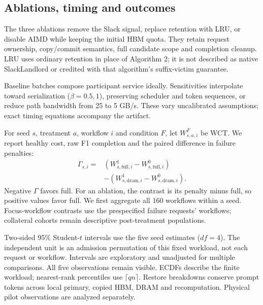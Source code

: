 \subsection{Ablations, timing and outcomes}
The three ablations remove the Slack signal, replace retention with LRU, or
disable AIMD while keeping the initial HBM quota. They retain request ownership,
copy/commit semantics, full candidate scope and completion cleanup. LRU uses
ordinary retention in place of Algorithm 2; it is not described as native
SlackLandlord or credited with that algorithm's suffix-victim guarantee.

Baseline batches compose participant service ideally. Sensitivities
interpolate toward serialization ($\beta=0.5,1$), preserving scheduler and
token sequences, or reduce path bandwidth from 25 to 5 GB/s. These vary
uncalibrated assumptions; exact timing equations accompany the artifact.

For seed $s$, treatment $a$, workflow $i$ and condition $F$, let
$W_{s,a,i}^{F}$ be WCT. We report healthy cost, raw F1 completion and the
paired difference in failure penalties:
\begin{equation}
\begin{split}
\Gamma_{s,i}={}&(W_{s,\mathrm{full},i}^{1}-W_{s,\mathrm{full},i}^{0})\\
 &-(W_{s,\mathrm{dram},i}^{1}-W_{s,\mathrm{dram},i}^{0}).
\end{split}
\end{equation}
Negative $\Gamma$ favors full. For an ablation, the contrast is its penalty
minus full, so positive values favor full. We first aggregate all 160
workflows within a seed. Focus-workflow contrasts use the prespecified
failure requests' workflows; collateral cohorts remain descriptive
post-treatment populations.

Two-sided 95\% Student-$t$ intervals use the five seed estimates ($df=4$).
The independent unit is an admission permutation of this fixed workload,
not each request or workflow. Intervals are exploratory and unadjusted for
multiple comparisons. All five observations remain visible. ECDFs describe
the finite workload; nearest-rank percentiles use $\lceil qn\rceil$. Restore breakdowns conserve
prompt tokens across local primary, copied HBM, DRAM and recomputation.
Physical pilot observations are analyzed separately.
